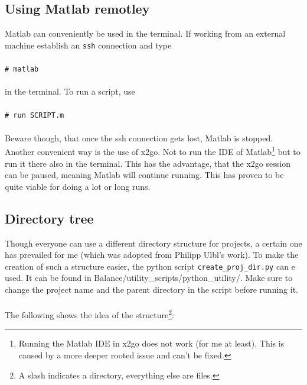 \documentclass[11pt]{article}
\newcommand{\shellcmd}[1]{\\\\\indent\indent\texttt{\footnotesize\# #1}\\\\}
\begin{document}
\subsection{Using Matlab remotley}
Matlab can conveniently be used in the terminal. If working from an external machine establish an \texttt{ssh} connection and type \shellcmd{matlab} in the terminal. To run a script, use \shellcmd{run SCRIPT.m} Beware though, that once the ssh connection gets lost, Matlab is stopped.\\
Another convenient way is the use of x2go. Not to run the IDE of Matlab\footnote{Running the Matlab IDE in x2go does not work (for me at least). This is caused by a more deeper rooted issue and can't be fixed.} but to run it there also in the terminal. This has the advantage, that the x2go session can be paused, meaning Matlab will continue running. This has proven to be quite viable for doing a lot or long runs.

\subsection{Directory tree}
Though everyone can use a different directory structure for projects, a certain one has prevailed for me (which was adopted from Philipp Ulbl's work). To make the creation of such a structure easier, the python script \texttt{create\_proj\_dir.py} can e used. It can be found in Balance/utility\_scripts/python\_utility/. Make sure to change the project name and the parent directory in the script before running it. \\\\
\pagebreak
The following shows the idea of the structure\footnote{A slash indicates a directory, everything else are files.}:
\end{document}
